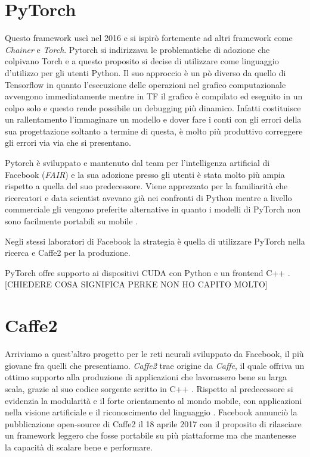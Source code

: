 \section{PyTorch}
Questo framework uscì nel 2016 e si ispirò fortemente ad altri framework come \textit{Chainer} e \textit{Torch}. Pytorch si indirizzava le problematiche di adozione che colpivano Torch e a questo proposito si decise di utilizzare come linguaggio d'utilizzo per gli utenti Python. Il suo approccio è un pò diverso da quello di Tensorflow in quanto l'esecuzione delle operazioni nel grafico computazionale avvengono immediatamente mentre in TF il grafico è compilato ed eseguito in un colpo solo e questo rende possibile un debugging più dinamico. Infatti costituisce un rallentamento l'immaginare un modello e dover fare i conti con gli errori della sua progettazione soltanto a termine di questa, è molto più produttivo correggere gli errori via via che si presentano. 

Pytorch è sviluppato e mantenuto dal team per l'intelligenza artificial di Facebook (\textit{FAIR}) e la sua adozione presso gli utenti è stata molto più ampia rispetto a quella del suo predecessore. Viene apprezzato per la familiarità che ricercatori e data scientist avevano già nei confronti di Python mentre a livello commerciale gli vengono preferite alternative in quanto i modelli di PyTorch non sono facilmente portabili su mobile \cite{oreilly:pytorch_intro}.

Negli stessi laboratori di Facebook la strategia è quella di utilizzare PyTorch nella ricerca e Caffe2 per la produzione.

PyTorch offre supporto ai dispositivi CUDA con Python e un frontend C++ \cite{pytorch:docs}. [CHIEDERE COSA SIGNIFICA PERKE NON HO CAPITO MOLTO]

\section{Caffe2}
Arriviamo a quest'altro progetto per le reti neurali sviluppato da Facebook, il più giovane fra quelli che presentiamo. \textit{Caffe2} trae origine da \textit{Caffe}, il quale offriva un ottimo supporto alla produzione di applicazioni che lavorassero bene su larga scala, grazie al suo codice sorgente scritto in C++ \cite{caffe_intro}. Rispetto al predecessore si evidenzia la modularità e il forte orientamento al mondo mobile, con applicazioni nella visione artificiale e il riconoscimento del linguaggio \cite{wiki:caffe2}. Facebook annunciò la pubblicazione open-source di Caffe2 il 18 aprile 2017 con il proposito di rilasciare un framework leggero che fosse portabile su più piattaforme ma che mantenesse la capacità di scalare bene e performare\cite{caffe_announcement}.

